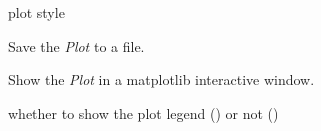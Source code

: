 \documentclass[a4paper,10pt,english]{sphinxmanual}
\begin{document}
\begin{fulllineitems}
\begin{fulllineitems}
\end{fulllineitems}


\begin{fulllineitems}
\label{index:kafe.plot.Plot.plot_style}
plot style

\end{fulllineitems}


\begin{fulllineitems}
\label{index:kafe.plot.Plot.save}
Save the \emph{Plot} to a file.

\end{fulllineitems}


\begin{fulllineitems}
\label{index:kafe.plot.Plot.show}
Show the \emph{Plot} in a matplotlib interactive window.

\end{fulllineitems}


\begin{fulllineitems}
\label{index:kafe.plot.Plot.show_legend}
whether to show the plot legend () or not ()

\end{fulllineitems}


\end{fulllineitems}

\end{document}
